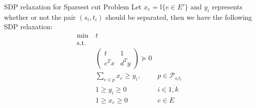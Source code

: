 \documentclass[10pt]{beamer}
\begin{document}
	\begin{frame}{SDP relaxation for Sparsest cut Problem}
	    Let $x_e = \mathbb{I}\{e \in E'\}$ and $y_i$ represents whether or not the pair $(s_i, t_i)$ should be separated, then we have the following SDP relaxation:
	    \begin{align*}
	        \min &~t &\\
	        \text{s.t.}& &\\ 
	        &~ \begin{pmatrix} t & 1 \\ c^Tx & d^Ty \end{pmatrix} \succeq 0 &\\
	        &~ \sum_{e \in p} x_e \geq y_i,  &p \in \mathcal{P}_{s_i t_i} \\
	        &~ 1 \geq y_i \geq 0  &i \in \overline{1, k} \\
	        &~ 1\geq x_e \geq 0 & e \in E
	    \end{align*}
	\end{frame}
\end{document}
